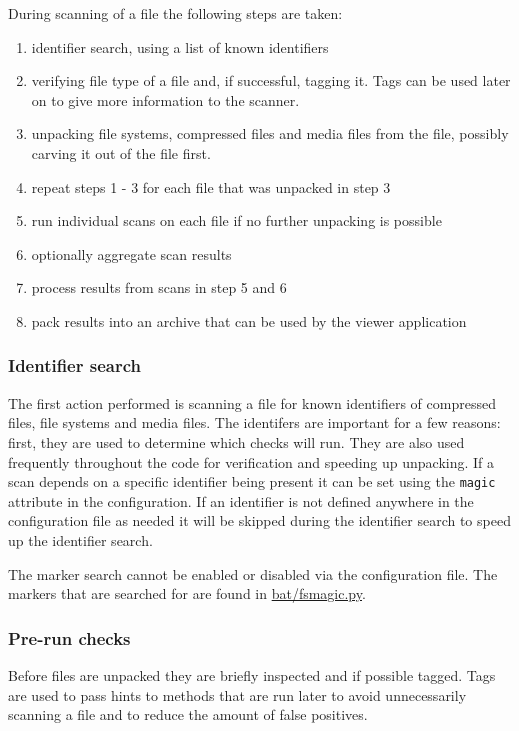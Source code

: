 \documentclass[10pt]{article}
\begin{document}
During scanning of a file the following steps are taken:

\begin{enumerate}
\item identifier search, using a list of known identifiers
\item verifying file type of a file and, if successful, tagging it. Tags can
be used later on to give more information to the scanner.
\item unpacking file systems, compressed files and media files from the file,
possibly carving it out of the file first.
\item repeat steps 1 - 3 for each file that was unpacked in step 3
\item run individual scans on each file if no further unpacking is possible
\item optionally aggregate scan results
\item process results from scans in step 5 and 6
\item pack results into an archive that can be used by the viewer application
\end{enumerate}

\subsubsection{Identifier search}

The first action performed is scanning a file for known identifiers of
compressed files, file systems and media files. The identifers are important
for a few reasons: first, they are used to determine which checks will run. They
are also used frequently throughout the code for verification and speeding up
unpacking. If a scan depends on a specific identifier being present it can be
set using the \texttt{magic} attribute in the configuration. If an identifier
is not defined anywhere in the configuration file as needed it will be skipped
during the identifier search to speed up the identifier search.

The marker search cannot be enabled or disabled via the configuration file. The
markers that are searched for are found in \url{bat/fsmagic.py}.

\subsubsection{Pre-run checks}

Before files are unpacked they are briefly inspected and if possible tagged.
Tags are used to pass hints to methods that are run later to avoid unnecessarily
scanning a file and to reduce the amount of false positives.
\end{document}
